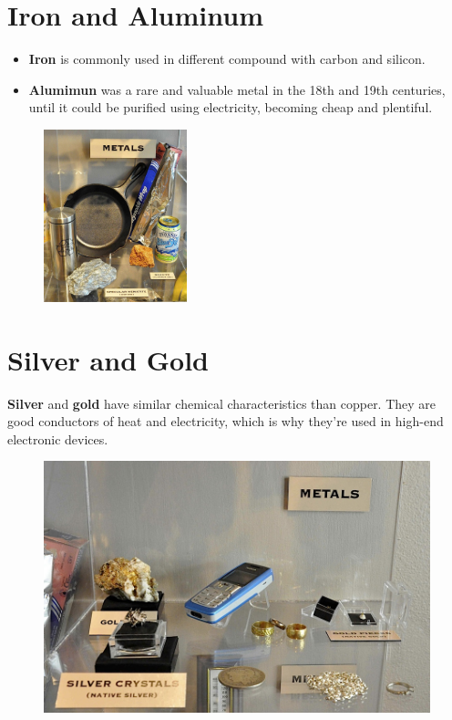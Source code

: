\documentclass[12pt, letterpaper]{article}
\begin{document}
\pagebreak

\section{Iron and Aluminum}

	\begin{itemize}
		\item \textbf{Iron} is commonly used in different compound with carbon and silicon.
		\item \textbf{Alumimun} was a rare and valuable metal in the 18th and 19th centuries, until it could be purified using electricity, becoming cheap and plentiful.
	\end{itemize}
	
	\begin{figure}[h]
		\includegraphics[height=5cm]{shelf08_0}
		\centering
	\end{figure}
	
\section{Silver and Gold}

	\textbf{Silver} and \textbf{gold} have similar chemical characteristics than copper. They are good conductors of heat and electricity, which is why they're used in high-end electronic devices.
	
	\begin{figure}[h]
		\includegraphics{shelf09}
		\centering
	\end{figure}
\end{document}
